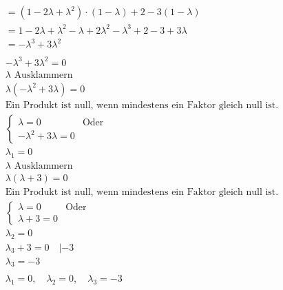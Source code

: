\begin{align*}
    = (1 - 2\lambda + \lambda^2) \cdot (1 - \lambda) + 2 - 3(1 - \lambda)            \\
    = 1 - 2\lambda + \lambda^2 - \lambda + 2\lambda^2 - \lambda^3 + 2 - 3 + 3\lambda \\
    = -\lambda^3 + 3\lambda^2                                                        \\\\
    -\lambda^3 + 3\lambda^2 = 0                                                      \\
    \text{$\lambda$ Ausklammern}                                                     \\
    \lambda (-\lambda^2 + 3\lambda) = 0                                              \\
    \text{Ein Produkt ist null, wenn mindestens ein Faktor gleich null ist.}         \\
    \begin{cases}
        \lambda = 0 & \text{Oder} \\
        -\lambda^2 + 3 \lambda = 0
    \end{cases}                                                        \\
    \lambda_1 = 0                                                                    \\
    \text{$\lambda$ Ausklammern}                                                     \\
    \lambda(\lambda + 3) = 0                                                         \\
    \text{Ein Produkt ist null, wenn mindestens ein Faktor gleich null ist.}         \\
    \begin{cases}
        \lambda = 0 & \text{Oder} \\
        \lambda + 3 = 0
    \end{cases}                                                        \\
    \lambda_2 = 0                                                                    \\
    \lambda_3 + 3 = 0 \quad | -3                                                     \\
    \lambda_3 = -3                                                                   \\\\
    \lambda_1 = 0, \quad \lambda_2 = 0, \quad \lambda_3 = -3
\end{align*}

